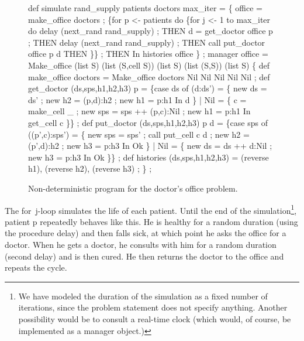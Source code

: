 \begin{figure}[htbp]
 \hdivider
\begin{idenv}
def simulate rand\_supply patients doctors max\_iter =
    \{ office = make\_office doctors ;
      \{for p <- patients do                        %
        \{for j <- 1 to max\_iter do
                delay (next\_rand rand\_supply) ;    %
          THEN  d = get\_doctor office p ;
          THEN  delay (next\_rand rand\_supply) ;    %
          THEN  call put\_doctor office p d
          THEN \}\} ;
    THEN
    In
      histories office \} ;
\null
manager office = Make\_office (list S)                        %
                             (list (S,cell S))               %
                             (list S) (list (S,S)) (list S)  %
\{
    def make\_office doctors = Make\_office doctors Nil Nil Nil Nil Nil ;
\null
    def get\_doctor (ds,sps,h1,h2,h3) p =
        \{case ds of
           (d:ds') = \{ new ds = ds' ;                     %
                       new h2 = (p,d):h2 ;  new h1 = p:h1
                     In
                       d \}
         | Nil     = \{ c = make\_cell \_ ;                  %
                       new sps = sps ++ (p,c):Nil ;
                       new h1 = p:h1
                     In
                       get\_cell c \}\} ;
\null
    def put\_doctor (ds,sps,h1,h2,h3) p d =
        \{case sps of
           ((p',c):sps') = \{ new sps = sps' ;             %
                             call put\_cell c d ;          %
                             new h2 = (p',d):h2 ;  new h3 = p:h3
                           In
                             Ok \}
         | Nil           = \{ new ds = ds ++ d:Nil ;       %
                             new h3 = p:h3
                           In
                             Ok \}\} ;
\null
    def histories (ds,sps,h1,h2,h3) = (reverse h1), (reverse h2), (reverse h3) ;
\} ;
\end{idenv}
 \caption{%
    \label{doctor-non-det-program}
    Non-deterministic program for the doctor's office problem.
         }
 \hdivider
\end{figure}

The \mbox{\cf for j}-loop simulates the life of each patient.  Until
the end of the simulation\footnote{ We have modeled the duration of
the simulation as a fixed number of iterations, since the problem
statement does not specify anything. Another possibility would be to
consult a real-time clock (which would, of course, be implemented as a
manager object.)}, patient {\cf p} repeatedly behaves like this.  He
is healthy for a random duration (using the procedure {\cf delay}) and
then falls sick, at which point he asks the office for a doctor.  When
he gets a doctor, he consults with him for a random duration (second
{\cf delay}) and is then cured.  He then returns the doctor to the
office and repeats the cycle.

